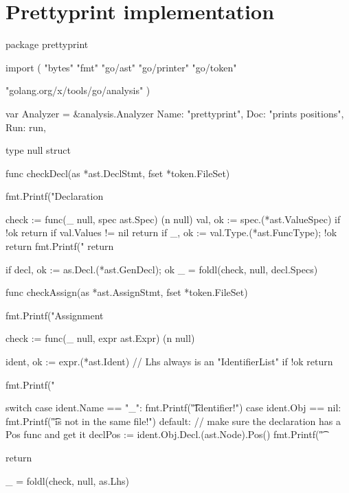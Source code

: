 \section{Prettyprint implementation}\label{appendix:prettyprint-func}
\begin{code}
\end{code}
\begin{code}
	\begin{gocode}
package prettyprint

import (
	"bytes"
	"fmt"
	"go/ast"
	"go/printer"
	"go/token"

	"golang.org/x/tools/go/analysis"
)

var Analyzer = &analysis.Analyzer{
	Name: "prettyprint",
	Doc:  "prints positions",
	Run:  run,
}

type null struct{}

func checkDecl(as *ast.DeclStmt, fset *token.FileSet) {
	fmt.Printf("Declaration %

	check := func(_ null, spec ast.Spec) (n null) {
		val, ok := spec.(*ast.ValueSpec)
		if !ok {
			return
		}
		if val.Values != nil {
			return
		}
		if _, ok := val.Type.(*ast.FuncType); !ok {
			return
		}
		fmt.Printf("\tIdent %
		return
	}

	if decl, ok := as.Decl.(*ast.GenDecl); ok {
		_ = foldl(check, null{}, decl.Specs)
	}
}

func checkAssign(as *ast.AssignStmt, fset *token.FileSet) {
	fmt.Printf("Assignment %

	check := func(_ null, expr ast.Expr) (n null) {
		ident, ok := expr.(*ast.Ident) // Lhs always is an "IdentifierList"
		if !ok {
			return
		}

		fmt.Printf("\tIdent %

		switch {
		case ident.Name == "_":
			fmt.Printf("\t\tBlank Identifier!\n")
		case ident.Obj == nil:
			fmt.Printf("\t\tDecl is not in the same file!\n")
		default:
			// make sure the declaration has a Pos func and get it
			declPos := ident.Obj.Decl.(ast.Node).Pos()
			fmt.Printf("\t\tDecl %
		}

		return
	}
	_ = foldl(check, null{}, as.Lhs)
}


\end{gocode}
\end{code}
